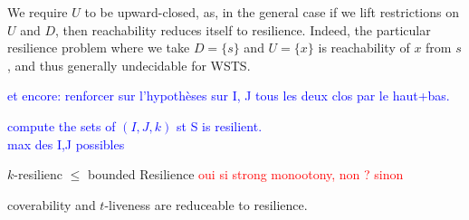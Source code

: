 \begin{remark} 
We require $U$ to be upward-closed, as, in the general case if we lift restrictions on $U$ and $D$, then reachability reduces itself to resilience. Indeed, the particular resilience problem where we take $D = \{s\}$ and $U = \{x\}$ is reachability of $x$ from $s$, and thus generally undecidable for WSTS. 
\end{remark}

\textcolor{blue}{
et encore: renforcer sur l'hypothèses sur I, J tous les deux clos par le haut+bas.
}

\textcolor{blue}{
compute the sets of $(I,J,k)$ st S is resilient.\\
max des I,J possibles \\
}



\begin{remark} 
$k$-resilienc $\leq$ bounded Resilience 
\textcolor{red}{oui si strong monootony, non ? sinon}
\end{remark}


\begin{proposition}\label{reductions}
coverability and $t$-liveness are reduceable to resilience.
\end{proposition}


